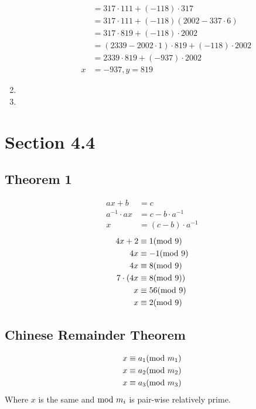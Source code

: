 \documentclass{article}
\begin{document}
\begin{enumerate}[label = \textbf{\alph*)}]
\begin{itemize}
\begin{align*}
			              & = 317 \cdot 111 + (-118) \cdot 317                    \\
			              & = 317 \cdot 111 + (-118)(2002 - 337 \cdot 6)          \\
			              & = 317 \cdot 819 + (-118) \cdot 2002                   \\
			              & = (2339 - 2002 \cdot 1) \cdot 819 + (-118) \cdot 2002 \\
			              & = 2339 \cdot 819 + (-937) \cdot 2002                  \\
			            x & = -937, y = 819
		            \end{align*}
	      \end{itemize}
	\item
	\item
\end{enumerate}

\section{Section 4.4}

\subsection{Theorem 1}

\begin{align*}
	ax + b          & = c                    \\
	a^{-1} \cdot ax & = c - b \cdot a^{-1}   \\
	x               & = (c - b) \cdot a^{-1}
\end{align*}
\begin{align*}
	4x + 2       & \equiv 1 (\text{mod } 9)   \\
	4x           & \equiv -1 (\text{mod } 9)  \\
	4x           & \equiv 8 (\text{mod } 9)   \\
	7 \cdot ( 4x & \equiv 8 (\text{mod } 9) ) \\
	x            & \equiv 56 (\text{mod } 9)  \\
	x            & \equiv 2 (\text{mod } 9)
\end{align*}

\subsection{Chinese Remainder Theorem}

\begin{align*}
	x & \equiv a_1 (\text{mod } m_1) \\
	x & \equiv a_2 (\text{mod } m_2) \\
	x & \equiv a_3 (\text{mod } m_3) \\
\end{align*}
Where $ x $ is the same and $ \text{mod } m_i $ is pair-wise relatively prime.
\end{document}
